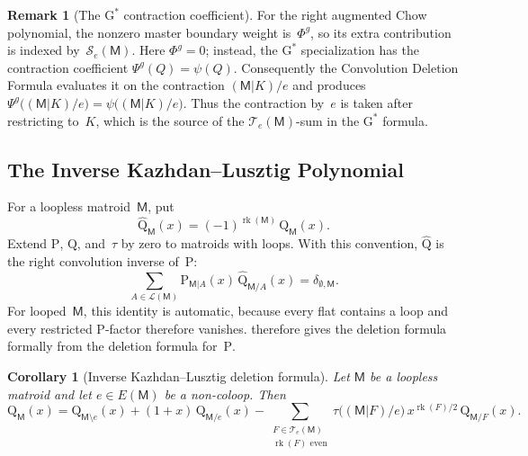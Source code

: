 \documentclass[12pt,letterpaper,english]{amsart}
\theoremstyle{teoremas}
\newtheorem{corollary}[theorem]{Corollary}
\theoremstyle{definition}
\newtheorem{remark}[theorem]{Remark}
\DeclareMathOperator{\rk}{rk}
\newcommand{\M}{\mathsf{M}}
\newcommand{\Gstar}{\mathrm{G}^{*}}
\newcommand{\PP}{\mathrm{P}}
\newcommand{\QQ}{\mathrm{Q}}
\newcommand{\Se}{\mathcal{S}_e}
\newcommand{\Te}{\mathcal{T}_e}
\begin{document}
\begin{remark}[The $\Gstar$ contraction coefficient]\label{rem:Gstar-coeff}
For the right augmented Chow polynomial, the nonzero master boundary
weight is~$\Phi^g$, so its extra contribution is indexed by~$\Se(\M)$.
Here $\Phi^g = 0$; instead, the $\Gstar$ specialization has the
contraction coefficient
$\Psi^g(Q) = \psi(Q)$.
Consequently the Convolution Deletion Formula evaluates it
on the contraction $(\M|K)/e$ and produces
$\Psi^g\bigl((\M|K)/e\bigr) = \psi\bigl((\M|K)/e\bigr)$.
Thus the contraction by~$e$ is taken after restricting to~$K$,
which is the source of the $\Te(\M)$-sum in the $\Gstar$ formula.
\end{remark}


\subsection{The Inverse Kazhdan--Lusztig Polynomial}
For a loopless matroid~$\M$, put
\[
\hat{\QQ}_{\M}(x) = (-1)^{\rk(\M)}\, \QQ_{\M}(x).
\]
Extend $\PP$, $\QQ$, and~$\tau$ by zero to matroids with loops.
With this convention, $\hat{\QQ}$ is the right convolution inverse of~$\PP$:
\begin{equation}\label{eq:PQ-inv}
\sum_{A \in \mathcal{L}(\M)}
  \PP_{\M|A}(x)\, \hat{\QQ}_{\M/A}(x) = \delta_{\emptyset, \M}.
\end{equation}
For looped~$\M$, this identity is automatic, because every flat
contains a loop and every restricted $\PP$-factor therefore vanishes.
 therefore gives the deletion formula
formally from the deletion formula for~$\PP$.

\begin{corollary}[Inverse Kazhdan--Lusztig deletion formula]
\label{cor:invKL-del}
Let $\M$ be a loopless matroid and let $e \in E(\M)$ be a non-coloop.
Then
\begin{equation}\label{eq:invKL-del}
\QQ_{\M}(x) = \QQ_{\M \setminus e}(x)
  + (1+x)\, \QQ_{\M/e}(x)
  - \sum_{\substack{F \in \Te(\M) \\ \rk(F) \text{ even}}}
    \tau\bigl((\M|F)/e\bigr)\, x^{\rk(F)/2}\,
    \QQ_{\M/F}(x).
\end{equation}
\end{corollary}
\end{document}
